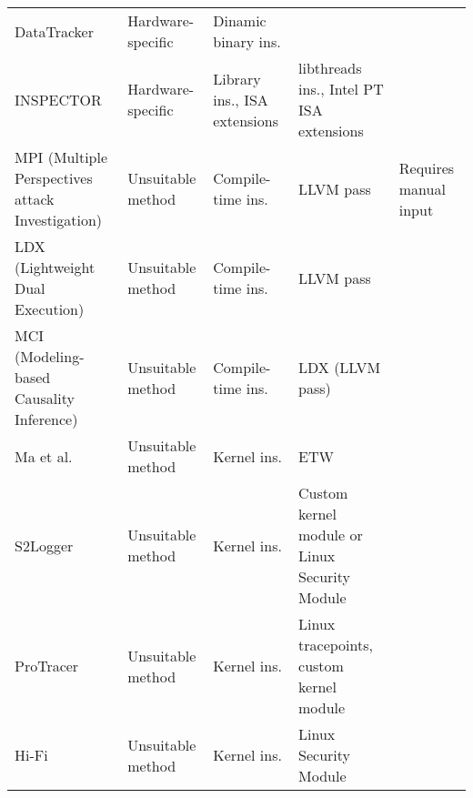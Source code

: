 \begin{table}
{\begin{tabular}{p{}p{}p{}p{}p{}}
DataTracker \cite{stamatogiannakis_looking_2015}              & Hardware-specific & Dinamic binary ins.                             &                                               &                                                               \\
INSPECTOR                                                     & Hardware-specific & Library ins., ISA extensions                    & libthreads ins., Intel PT ISA extensions      &                                                               \\
MPI (Multiple Perspectives attack Investigation)
\cite{ma_mpi_2017}                                            & Unsuitable method & Compile-time ins.                               & LLVM pass                                     & Requires manual input                                         \\
LDX (Lightweight Dual Execution) \cite{kwon_ldx_2016}         & Unsuitable method & Compile-time ins.                               & LLVM pass                                     &                                                               \\
MCI (Modeling-based Causality Inference) \cite{kwon_mci_2018} & Unsuitable method & Compile-time ins.                               & LDX (LLVM pass)                               &                                                               \\
Ma et al. \cite{ma_accurate_2015}                             & Unsuitable method & Kernel ins.                                     & ETW                                           &                                                               \\
S2Logger \cite{suen_s2logger_2013}                            & Unsuitable method & Kernel ins.                                     & Custom kernel module or Linux Security Module &                                                               \\
ProTracer \cite{ma_protracer_2016}                            & Unsuitable method & Kernel ins.                                     & Linux tracepoints, custom kernel module       &                                                               \\
Hi-Fi \cite{pohly_hi-fi_2012}                                 & Unsuitable method & Kernel ins.                                     & Linux Security Module                         &                                                               \\

\end{tabular}}
\end{table}
